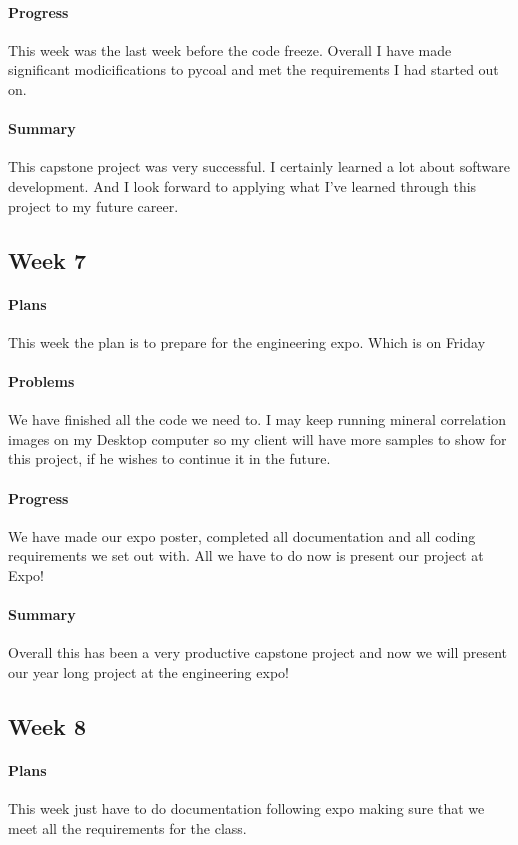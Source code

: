 \documentclass{article}
\begin{document}
\paragraph{Progress}
This week was the last week before the code freeze. Overall I have made significant modicifications to pycoal and met the requirements I had started out on.
\paragraph{Summary}
This capstone project was very successful. I certainly learned a lot about software development. And I look forward to applying what I've learned through this project to my future career.
\subsection{Week 7}
\paragraph{Plans}
This week the plan is to prepare for the engineering expo. Which is on Friday
\paragraph{Problems}
We have finished all the code we need to. I may keep running mineral correlation images on my Desktop computer so my client will have more samples to show for this project, if he wishes to continue it in the future.
\paragraph{Progress}
We have made our expo poster, completed all documentation and all coding requirements we set out with. All we have to do now is present our project at Expo!
\paragraph{Summary}
Overall this has been a very productive capstone project and now we will present our year long project at the engineering expo!
\subsection{Week 8}
\paragraph{Plans}
This week just have to do documentation following expo making sure that we meet all the requirements for the class.
\end{document}
